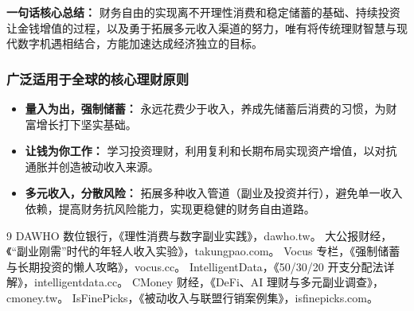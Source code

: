 \documentclass[
  12pt]{article}
\providecommand{\tightlist}{%
  \setlength{\itemsep}{0pt}\setlength{\parskip}{0pt}}
\begin{document}
\textbf{一句话核心总结：}
财务自由的实现离不开理性消费和稳定储蓄的基础、持续投资让金钱增值的过程，以及勇于拓展多元收入渠道的努力，唯有将传统理财智慧与现代数字机遇相结合，方能加速达成经济独立的目标。

\hypertarget{ux5e7fux6cdbux9002ux7528ux4e8eux5168ux7403ux7684ux6838ux5fc3ux7406ux8d22ux539fux5219}{%
\subsubsection{广泛适用于全球的核心理财原则}\label{ux5e7fux6cdbux9002ux7528ux4e8eux5168ux7403ux7684ux6838ux5fc3ux7406ux8d22ux539fux5219}}

\begin{itemize}
\tightlist
\item
  \textbf{量入为出，强制储蓄：}
  永远花费少于收入，养成先储蓄后消费的习惯，为财富增长打下坚实基础。
\item
  \textbf{让钱为你工作：}
  学习投资理财，利用复利和长期布局实现资产增值，以对抗通胀并创造被动收入来源。
\item
  \textbf{多元收入，分散风险：}
  拓展多种收入管道（副业及投资并行），避免单一收入依赖，提高财务抗风险能力，实现更稳健的财务自由道路。
\end{itemize}

\begin{thebibliography}{9}
 DAWHO 数位银行，《理性消费与数字副业实践》，dawho.tw。
 大公报财经，《“副业刚需”时代的年轻人收入实验》，takungpao.com。
 Vocus 专栏，《强制储蓄与长期投资的懒人攻略》，vocus.cc。
 IntelligentData，《50/30/20 开支分配法详解》，intelligentdata.cc。
 CMoney 财经，《DeFi、AI 理财与多元副业调查》，cmoney.tw。
 IsFinePicks，《被动收入与联盟行销案例集》，isfinepicks.com。
\end{thebibliography}
\end{document}
